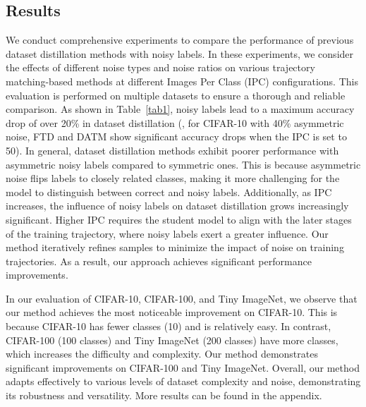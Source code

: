 \subsection{Results}





We conduct comprehensive experiments to compare the performance of previous dataset distillation methods with noisy labels.
In these experiments, we consider the effects of different noise types and noise ratios on various trajectory matching-based methods at different Images Per Class (IPC) configurations. 
This evaluation is performed on multiple datasets to ensure a thorough and reliable comparison.
As shown in Table~\ref{tab1}, noisy labels lead to a maximum accuracy drop of over 20\% in dataset distillation (\eg, for CIFAR-10 with 40\% asymmetric noise, FTD and DATM show significant accuracy drops when the IPC is set to 50).
In general, dataset distillation methods exhibit poorer performance with asymmetric noisy labels compared to symmetric ones. 
This is because asymmetric noise flips labels to closely related classes, making it more challenging for the model to distinguish between correct and noisy labels. 
Additionally, as IPC increases, the influence of noisy labels on dataset distillation grows increasingly significant.
Higher IPC requires the student model to align with the later stages of the training trajectory, where noisy labels exert a greater influence.
Our method iteratively refines samples to minimize the impact of noise on training trajectories. 
As a result, our approach achieves significant performance improvements.


In our evaluation of CIFAR-10, CIFAR-100, and Tiny ImageNet, we observe that our method achieves the most noticeable improvement on CIFAR-10.
This is because CIFAR-10 has fewer classes (10) and is relatively easy. 
In contrast, CIFAR-100 (100 classes) and Tiny ImageNet (200 classes) have more classes, which increases the difficulty and complexity. 
Our method demonstrates significant improvements on CIFAR-100 and Tiny ImageNet.
Overall, our method adapts effectively to various levels of dataset complexity and noise, demonstrating its robustness and versatility.
More results can be found in the appendix.


